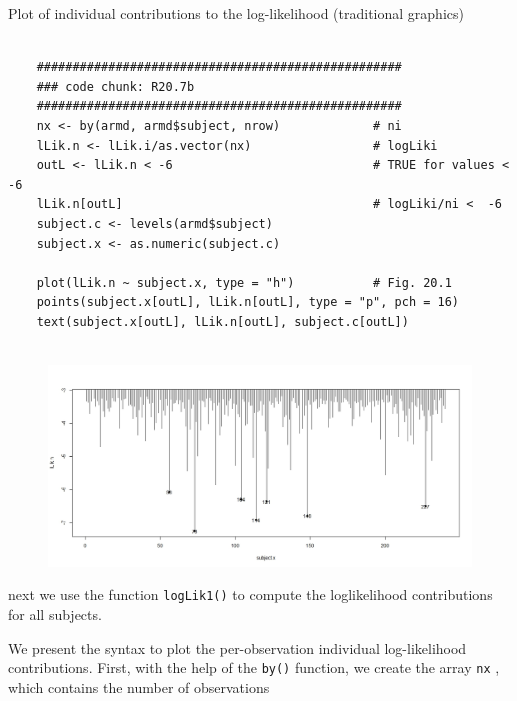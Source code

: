 \documentclass[a4paper,12pt]{article}
\begin{document}
Plot of individual contributions to the log-likelihood (traditional graphics)
\begin{framed}
\begin{verbatim}
	
	###################################################
	### code chunk: R20.7b
	###################################################
	nx <- by(armd, armd$subject, nrow)             # ni
	lLik.n <- lLik.i/as.vector(nx)                 # logLiki
	outL <- lLik.n < -6                            # TRUE for values < -6
	lLik.n[outL]                                   # logLiki/ni <  -6
	subject.c <- levels(armd$subject)
	subject.x <- as.numeric(subject.c)
	
	plot(lLik.n ~ subject.x, type = "h")           # Fig. 20.1
	points(subject.x[outL], lLik.n[outL], type = "p", pch = 16)
	text(subject.x[outL], lLik.n[outL], subject.c[outL])
	
\end{verbatim}
\end{framed}
\begin{figure}
\centering
\includegraphics[width=0.7\linewidth]{images/Chap20-image2}
\caption{}
\label{fig:Chap20-image2}
\end{figure}


next we use the function \texttt{logLik1()} to compute the loglikelihood
contributions for all subjects.

\newpage



	

\newpage

We present the syntax to plot the per-observation individual log-likelihood contributions.
First, with the help of the \texttt{by()} function, we create the array \texttt{nx} , which contains the number
of observations

\end{document}
